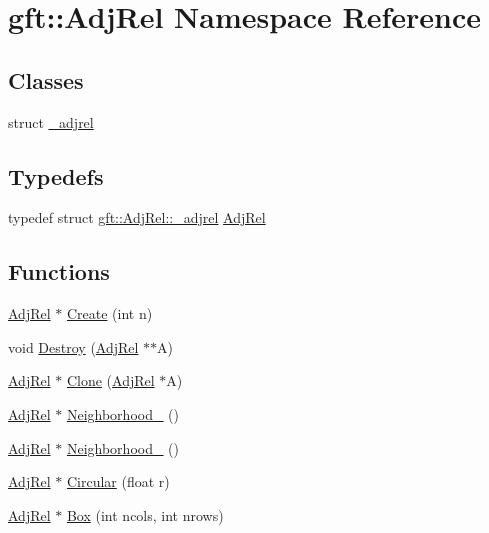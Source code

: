 \hypertarget{namespacegft_1_1AdjRel}{\section{gft\-:\-:Adj\-Rel Namespace Reference}
\label{namespacegft_1_1AdjRel}
}
\subsection*{Classes}
\begin{DoxyCompactItemize}
\item 
struct \hyperlink{structgft_1_1AdjRel_1_1__adjrel}{\-\_\-adjrel}
\end{DoxyCompactItemize}
\subsection*{Typedefs}
\begin{DoxyCompactItemize}
\item 
typedef struct \hyperlink{structgft_1_1AdjRel_1_1__adjrel}{gft\-::\-Adj\-Rel\-::\-\_\-adjrel} \hyperlink{namespacegft_1_1AdjRel_a832ff5521af7a9801ff18dc3ae629b68}{Adj\-Rel}
\end{DoxyCompactItemize}
\subsection*{Functions}
\begin{DoxyCompactItemize}
\item 
\hyperlink{namespacegft_1_1AdjRel_a832ff5521af7a9801ff18dc3ae629b68}{Adj\-Rel} $\ast$ \hyperlink{namespacegft_1_1AdjRel_a2a6eda47490e380f5e5b20f05b07aed0}{Create} (int n)
\item 
void \hyperlink{namespacegft_1_1AdjRel_ab33a090328b8c665320fb396b9f98bb6}{Destroy} (\hyperlink{namespacegft_1_1AdjRel_a832ff5521af7a9801ff18dc3ae629b68}{Adj\-Rel} $\ast$$\ast$A)
\item 
\hyperlink{namespacegft_1_1AdjRel_a832ff5521af7a9801ff18dc3ae629b68}{Adj\-Rel} $\ast$ \hyperlink{namespacegft_1_1AdjRel_a30356275766745962d6592f15b0c1481}{Clone} (\hyperlink{namespacegft_1_1AdjRel_a832ff5521af7a9801ff18dc3ae629b68}{Adj\-Rel} $\ast$A)
\item 
\hyperlink{namespacegft_1_1AdjRel_a832ff5521af7a9801ff18dc3ae629b68}{Adj\-Rel} $\ast$ \hyperlink{namespacegft_1_1AdjRel_af3c506e4f89e42601d0a7f955c0c6aa3}{Neighborhood\-\_} ()
\item 
\hyperlink{namespacegft_1_1AdjRel_a832ff5521af7a9801ff18dc3ae629b68}{Adj\-Rel} $\ast$ \hyperlink{namespacegft_1_1AdjRel_aae006980b7f2cec9ae3cc0736f278205}{Neighborhood\-\_} ()
\item 
\hyperlink{namespacegft_1_1AdjRel_a832ff5521af7a9801ff18dc3ae629b68}{Adj\-Rel} $\ast$ \hyperlink{namespacegft_1_1AdjRel_a51ca0d52a47da9b307410017005789bc}{Circular} (float r)
\item 
\hyperlink{namespacegft_1_1AdjRel_a832ff5521af7a9801ff18dc3ae629b68}{Adj\-Rel} $\ast$ \hyperlink{namespacegft_1_1AdjRel_a9d76de2bf1e8b4ecde0cad61fee87dfb}{Box} (int ncols, int nrows)
\end{DoxyCompactItemize}



